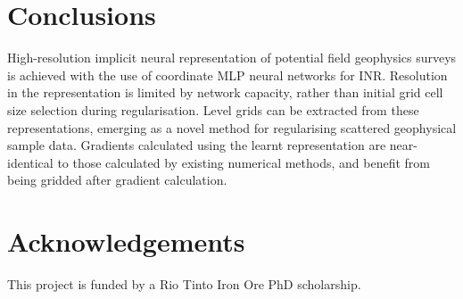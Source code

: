 \section{Conclusions}
High-resolution implicit neural representation of potential field geophysics surveys is achieved with the use of coordinate MLP neural networks for INR\@.
Resolution in the representation is limited by network capacity, rather than initial grid cell size selection during regularisation.
Level grids can be extracted from these representations, emerging as a novel method for regularising scattered geophysical sample data.
Gradients calculated using the learnt representation are near-identical to those calculated by existing numerical methods, and benefit from being gridded after gradient calculation.

\section{Acknowledgements}
This project is funded by a Rio Tinto Iron Ore PhD scholarship.

\printbibliography{}





% 